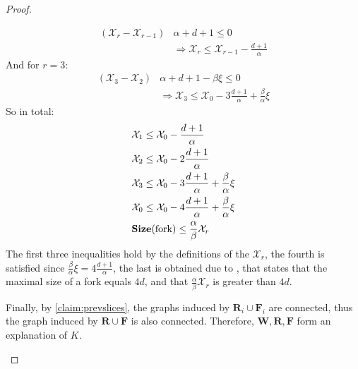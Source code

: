 \begin{proof}
\begin{enumerate}
\begin{enumerate}
\begin{equation*}
              \begin{split}
                (\mathcal{X}_{r}-\mathcal{X}_{r-1})  & \alpha  + d + 1  \le 0 
                \\ &  \Rightarrow \mathcal{X}_{r} \le  \mathcal{X}_{r-1} - \frac{d+1}{\alpha}  
  \end{split}
\end{equation*}
And for $r =3$:
\begin{equation*}
  \begin{split}
(\mathcal{X}_{3}-\mathcal{X}_{2}) & \alpha  + d + 1  -\beta \xi \le 0  \\ 
& \Rightarrow \mathcal{X}_{3} \le  \mathcal{X}_{0} - 3\frac{d+1}{\alpha} + \frac{\beta}{\alpha}\xi  
              \end{split}
            \end{equation*}
So in total: 
\begin{equation*}
  \begin{split}
&  \mathcal{X}_{1} \le  \mathcal{X}_{0} - \frac{d+1}{\alpha}  \\
&  \mathcal{X}_{2} \le  \mathcal{X}_{0} - 2\frac{d+1}{\alpha}  \\ 
&  \mathcal{X}_{3} \le  \mathcal{X}_{0} - 3\frac{d+1}{\alpha} + \frac{\beta}{\alpha}\xi  \\
&  \mathcal{X}_{0} \le  \mathcal{X}_{0} - 4\frac{d+1}{\alpha}  + \frac{\beta}{\alpha}\xi  \\
 & \mathbf{Size}(\text{fork}) \le \frac{\alpha}{\beta} \mathcal{X}_{r} 
  \end{split}
\end{equation*}
The first three inequalities hold by the definitions of the $\mathcal{X}_{r}$, the fourth is satisfied since $\frac{\beta}{\alpha}\xi = 4 \frac{d+1}{\alpha}$, the last is obtained due to , that states that the maximal size of a fork equals $4d$, and that $\frac{\alpha}{\beta}\mathcal{X}_{r}$ is greater than $4d$.
        \end{enumerate}
         Finally, by \cref{claim:prevslices}, the graphs induced by $\mathbf{R}_{i} \cup \mathbf{F}_{i}$ are connected, thus the graph induced by $\mathbf{R}\cup \mathbf{F}$ is also connected. Therefore, $\mathbf{W}, \mathbf{R}, \mathbf{F}$ form an explanation of $K$. 
    \end{enumerate}
  \end{proof}



